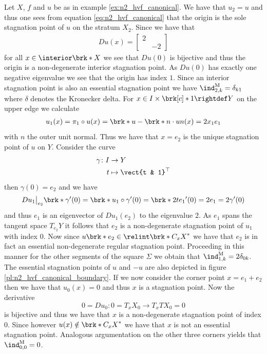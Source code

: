\begin{example}\label{ex:n2_hvf_index}
  Let $X$, $f$ and $u$ be as in example \ref{ex:n2_hvf_canonical}.
  We have that $u_2=u$ and thus
  one sees from equation \eqref{eq:n2_hvf_canonical}
  that the origin is the sole stagnation point of $u$ on the stratum $X_2$. Since we have that
  \begin{align*}
    Du(x) = \begin{bmatrix}
      2 & \\
       & -2
    \end{bmatrix}
  \end{align*}
  for all $x\in\openX$ we see that $Du(0)$ is bijective and thus the origin is a non-degenerate interior stagnation point.
  As $Du(0)$ has
  exactly one negative eigenvalue we see that the origin has index $1$. 
  Since an interior stagnation point is also an essential stagnation point 
  we have $\ind^\text{M}_{2,k}=\delta_{k1}$ where $\delta$ denotes the Kronecker delta.
  For $x\in I\times\brk[c]*{1}\rightdef Y$ on the upper edge we calculate
  \begin{align*}
    u_1(x)=\pi_1\circ u(x)=\brk*{u-\brk*{n\cdot u}n}(x)
    =2x_1e_1
  \end{align*}
  with $n$ the outer unit normal.
  Thus we have that $x=e_2$ is the unique stagnation point of $u$ on $Y$.
  Consider the curve
  \begin{align*}
    \gamma\colon I&\to Y\\
    t&\mapsto \vect{t & 1}^\top
  \end{align*}
  then $\gamma(0)=e_2$ and we have
  \begin{align*}
    Du_1\big\vert_{e_2}\brk*{\gamma'(0)}
    =\brk*{u_1\circ \gamma}'(0)
    =\brk*{2te_1}'(0)=2e_1=2\gamma'(0)
  \end{align*}
  and thus $e_1$ is an eigenvector of $Du_1(e_2)$ to the eigenvalue $2$. As $e_1$
  spans the tangent space $T_{e_2}Y$ it follows that $e_2$ is a non-degenerate stagnation point
  of $u_1$ with index $0$.
  Now since $u\brk*{e_2}\in\relint\brk*{C_xX}^*$ we have that $e_2$ is in fact an essential non-degenerate regular 
  stagnation point.
  Proceeding in this manner for the other segments of the square $\Sigma$ we obtain that
  $\ind^\text{M}_{1,k}=2\delta_{0k}$.
  The essential stagnation points of $u$ and $-u$ are also depicted in figure \ref{pl:n2_hvf_canonical_boundary}.
  If we now consider the corner point $x=e_1+e_2$ then we have that $u_0(x)=0$ and thus $x$ is a stagnation
  point.
  Now the derivative
  $$0=Du_0\colon 0=T_xX_0\to T_xTX_0=0$$
  is bijective and thus
  we have that $x$ is a non-degenerate stagnation point of
  index $0$. Since however $u(x)\notin \brk*{C_xX}^*$ we have that $x$ is not an essential stagnation point.
  Analogous argumentation on the other three corners yields that $\ind^\text{M}_{0,0}=0$.
\end{example}

